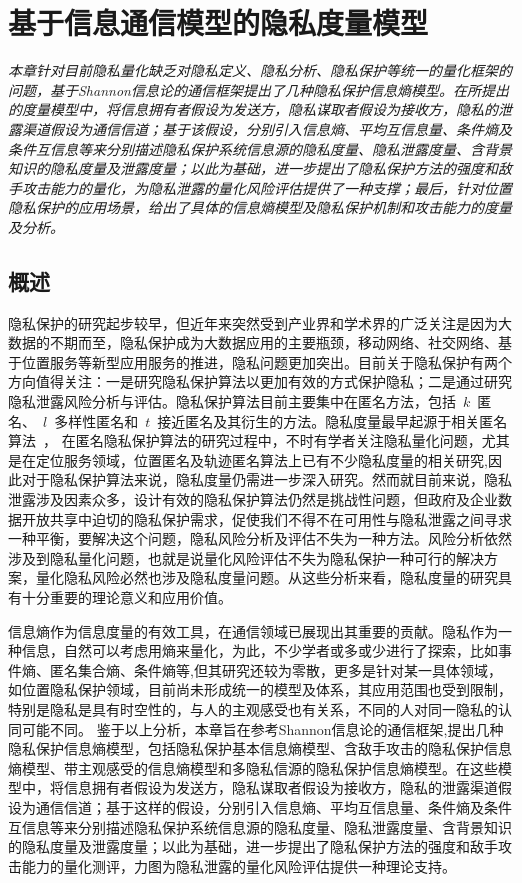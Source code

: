 \chapter{基于信息通信模型的隐私度量模型}
\label{chap:entropy-metric-model}

\textit{ }

\textit{本章针对目前隐私量化缺乏对隐私定义、隐私分析、隐私保护等统一的量化框架的问题，基于Shannon信息论的通信框架提出了几种隐私保护信息熵模型。在所提出的度量模型中，将信息拥有者假设为发送方，隐私谋取者假设为接收方，隐私的泄露渠道假设为通信信道；基于该假设，分别引入信息熵、平均互信息量、条件熵及条件互信息等来分别描述隐私保护系统信息源的隐私度量、隐私泄露度量、含背景知识的隐私度量及泄露度量；以此为基础，进一步提出了隐私保护方法的强度和敌手攻击能力的量化，为隐私泄露的量化风险评估提供了一种支撑；最后，针对位置隐私保护的应用场景，给出了具体的信息熵模型及隐私保护机制和攻击能力的度量及分析。}

\section{概述}

隐私保护的研究起步较早，但近年来突然受到产业界和学术界的广泛关注是因为大数据的不期而至，隐私保护成为大数据应用的主要瓶颈，移动网络、社交网络、基于位置服务等新型应用服务的推进，隐私问题更加突出。目前关于隐私保护有两个方向值得关注：一是研究隐私保护算法以更加有效的方式保护隐私；二是通过研究隐私泄露风险分析与评估。隐私保护算法目前主要集中在匿名方法，包括~$k$~匿名、~$l$~多样性匿名和~$t$~接近匿名及其衍生的方法。隐私度量最早起源于相关匿名算法~\cite{sweeney2002k}， 在匿名隐私保护算法的研究过程中，不时有学者关注隐私量化问题，尤其是在定位服务领域，位置匿名及轨迹匿名算法上已有不少隐私度量的相关研究\cite{shokri2011quantifying,olteanu2017quantifying},因此对于隐私保护算法来说，隐私度量仍需进一步深入研究。然而就目前来说，隐私泄露涉及因素众多，设计有效的隐私保护算法仍然是挑战性问题，但政府及企业数据开放共享中迫切的隐私保护需求，促使我们不得不在可用性与隐私泄露之间寻求一种平衡，要解决这个问题，隐私风险分析及评估不失为一种方法。风险分析依然涉及到隐私量化问题，也就是说量化风险评估不失为隐私保护一种可行的解决方案，量化隐私风险必然也涉及隐私度量问题。从这些分析来看，隐私度量的研究具有十分重要的理论意义和应用价值。

信息熵作为信息度量的有效工具，在通信领域已展现出其重要的贡献。隐私作为一种信息，自然可以考虑用熵来量化，为此，不少学者或多或少进行了探索，比如事件熵、匿名集合熵、条件熵等\cite{serjantov2002towards,diaz2002towards,wagner2018technical},但其研究还较为零散，更多是针对某一具体领域，如位置隐私保护领域，目前尚未形成统一的模型及体系，其应用范围也受到限制，特别是隐私是具有时空性的，与人的主观感受也有关系，不同的人对同一隐私的认同可能不同。 鉴于以上分析，本章旨在参考Shannon信息论的通信框架\cite{stone2018information},提出几种隐私保护信息熵模型，包括隐私保护基本信息熵模型、含敌手攻击的隐私保护信息熵模型、带主观感受的信息熵模型和多隐私信源的隐私保护信息熵模型。在这些模型中，将信息拥有者假设为发送方，隐私谋取者假设为接收方，隐私的泄露渠道假设为通信信道；基于这样的假设，分别引入信息熵、平均互信息量、条件熵及条件互信息等来分别描述隐私保护系统信息源的隐私度量、隐私泄露度量、含背景知识的隐私度量及泄露度量；以此为基础，进一步提出了隐私保护方法的强度和敌手攻击能力的量化测评，力图为隐私泄露的量化风险评估提供一种理论支持。


